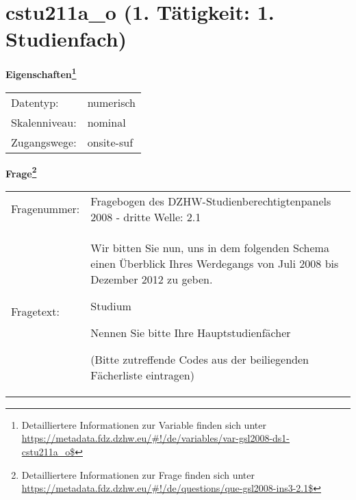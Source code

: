
    \setcounter{footnote}{0}

    \vspace*{-1.8cm}
	\section{cstu211a\_o (1. Tätigkeit: 1. Studienfach)}
	\label{section:cstu211a_o}



    \vspace*{0.5cm}
    \noindent\textbf{Eigenschaften\footnote{Detailliertere Informationen zur Variable finden sich unter
		\url{https://metadata.fdz.dzhw.eu/\#!/de/variables/var-gsl2008-ds1-cstu211a_o$}}}\\
	\begin{tabularx}{\hsize}{@{}lX}
	Datentyp: & numerisch \\
	Skalenniveau: & nominal \\
	Zugangswege: &
	  onsite-suf
 \\
    \end{tabularx}



				\vspace*{0.5cm}
                \noindent\textbf{Frage\footnote{Detailliertere Informationen zur Frage finden sich unter
		              \url{https://metadata.fdz.dzhw.eu/\#!/de/questions/que-gsl2008-ins3-2.1$}}}\\
				\begin{tabularx}{\hsize}{@{}lX}
					Fragenummer: &
					  Fragebogen des DZHW-Studienberechtigtenpanels 2008 - dritte Welle:
					  2.1
 \\
					Fragetext: & Wir bitten Sie nun, uns in dem folgenden Schema einen Überblick Ihres Werdegangs von Juli 2008 bis Dezember 2012 zu geben.\par  Studium\par  Nennen Sie bitte Ihre Hauptstudienfächer\par  (Bitte zutreffende Codes aus der beiliegenden Fächerliste eintragen) \\
				\end{tabularx}





